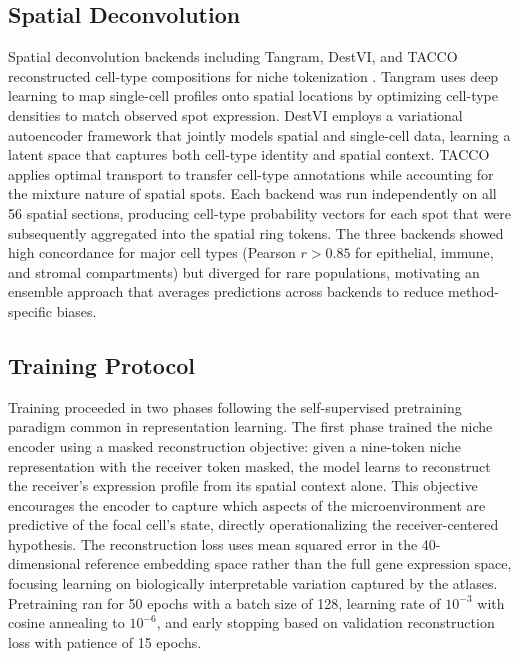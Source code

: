 \documentclass[conference]{IEEEtran}
\begin{document}
\subsection{Spatial Deconvolution}

Spatial deconvolution backends including Tangram, DestVI, and TACCO reconstructed cell-type compositions for niche tokenization \cite{Biancalani2021-bt,Lopez2022-ps,Mages2023-wj}. Tangram uses deep learning to map single-cell profiles onto spatial locations by optimizing cell-type densities to match observed spot expression. DestVI employs a variational autoencoder framework that jointly models spatial and single-cell data, learning a latent space that captures both cell-type identity and spatial context. TACCO applies optimal transport to transfer cell-type annotations while accounting for the mixture nature of spatial spots. Each backend was run independently on all 56 spatial sections, producing cell-type probability vectors for each spot that were subsequently aggregated into the spatial ring tokens. The three backends showed high concordance for major cell types (Pearson $r > 0.85$ for epithelial, immune, and stromal compartments) but diverged for rare populations, motivating an ensemble approach that averages predictions across backends to reduce method-specific biases.

\subsection{Training Protocol}

Training proceeded in two phases following the self-supervised pretraining paradigm common in representation learning. The first phase trained the niche encoder using a masked reconstruction objective: given a nine-token niche representation with the receiver token masked, the model learns to reconstruct the receiver's expression profile from its spatial context alone. This objective encourages the encoder to capture which aspects of the microenvironment are predictive of the focal cell's state, directly operationalizing the receiver-centered hypothesis. The reconstruction loss uses mean squared error in the 40-dimensional reference embedding space rather than the full gene expression space, focusing learning on biologically interpretable variation captured by the atlases. Pretraining ran for 50 epochs with a batch size of 128, learning rate of $10^{-3}$ with cosine annealing to $10^{-6}$, and early stopping based on validation reconstruction loss with patience of 15 epochs.
\end{document}
